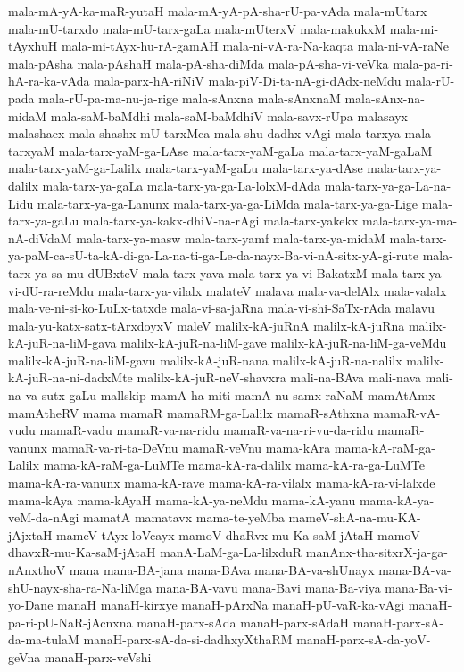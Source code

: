 {mala-mA-yA-ka-maR-yutaH
mala-mA-yA-pA-sha-rU-pa-vAda
mala-mUtarx
mala-mU-tarxdo
mala-mU-tarx-gaLa
mala-mUterxV
mala-makukxM
mala-mi-tAyxhuH
mala-mi-tAyx-hu-rA-gamAH
mala-ni-vA-ra-Na-kaqta
mala-ni-vA-raNe
mala-pAsha
mala-pAshaH
mala-pA-sha-diMda
mala-pA-sha-vi-veVka
mala-pa-ri-hA-ra-ka-vAda
mala-parx-hA-riNiV
mala-piV-Di-ta-nA-gi-dAdx-neMdu
mala-rU-pada
mala-rU-pa-ma-nu-ja-rige
mala-sAnxna
mala-sAnxnaM
mala-sAnx-na-midaM
mala-saM-baMdhi
mala-saM-baMdhiV
mala-savx-rUpa
malasayx
malashacx
mala-shashx-mU-tarxMca
mala-shu-dadhx-vAgi
mala-tarxya
mala-tarxyaM
mala-tarx-yaM-ga-LAse
mala-tarx-yaM-gaLa
mala-tarx-yaM-gaLaM
mala-tarx-yaM-ga-Lalilx
mala-tarx-yaM-gaLu
mala-tarx-ya-dAse
mala-tarx-ya-dalilx
mala-tarx-ya-gaLa
mala-tarx-ya-ga-La-lolxM-dAda
mala-tarx-ya-ga-La-na-Lidu
mala-tarx-ya-ga-Lanunx
mala-tarx-ya-ga-LiMda
mala-tarx-ya-ga-Lige
mala-tarx-ya-gaLu
mala-tarx-ya-kakx-dhiV-na-rAgi
mala-tarx-yakekx
mala-tarx-ya-ma-nA-diVdaM
mala-tarx-ya-masw
mala-tarx-yamf
mala-tarx-ya-midaM
mala-tarx-ya-paM-ca-sU-ta-kA-di-ga-La-na-ti-ga-Le-da-nayx-Ba-vi-nA-sitx-yA-gi-rute
mala-tarx-ya-sa-mu-dUBxteV
mala-tarx-yava
mala-tarx-ya-vi-BakatxM
mala-tarx-ya-vi-dU-ra-reMdu
mala-tarx-ya-vilalx
malateV
malava
mala-va-delAlx
mala-valalx
mala-ve-ni-si-ko-LuLx-tatxde
mala-vi-sa-jaRna
mala-vi-shi-SaTx-rAda
malavu
mala-yu-katx-satx-tArxdoyxV
maleV
malilx-kA-juRnA
malilx-kA-juRna
malilx-kA-juR-na-liM-gava
malilx-kA-juR-na-liM-gave
malilx-kA-juR-na-liM-ga-veMdu
malilx-kA-juR-na-liM-gavu
malilx-kA-juR-nana
malilx-kA-juR-na-nalilx
malilx-kA-juR-na-ni-dadxMte
malilx-kA-juR-neV-shavxra
mali-na-BAva
mali-nava
mali-na-va-sutx-gaLu
mallskip
mamA-ha-miti
mamA-nu-samx-raNaM
mamAtAmx
mamAtheRV
mama
mamaR
mamaRM-ga-Lalilx
mamaR-sAthxna
mamaR-vA-vudu
mamaR-vadu
mamaR-va-na-ridu
mamaR-va-na-ri-vu-da-ridu
mamaR-vanunx
mamaR-va-ri-ta-DeVnu
mamaR-veVnu
mama-kAra
mama-kA-raM-ga-Lalilx
mama-kA-raM-ga-LuMTe
mama-kA-ra-dalilx
mama-kA-ra-ga-LuMTe
mama-kA-ra-vanunx
mama-kA-rave
mama-kA-ra-vilalx
mama-kA-ra-vi-lalxde
mama-kAya
mama-kAyaH
mama-kA-ya-neMdu
mama-kA-yanu
mama-kA-ya-veM-da-nAgi
mamatA
mamatavx
mama-te-yeMba
mameV-shA-na-mu-KA-jAjxtaH
mameV-tAyx-loVcayx
mamoV-dhaRvx-mu-Ka-saM-jAtaH
mamoV-dhavxR-mu-Ka-saM-jAtaH
manA-LaM-ga-La-lilxduR
manAnx-tha-sitxrX-ja-ga-nAnxthoV
mana
mana-BA-jana
mana-BAva
mana-BA-va-shUnayx
mana-BA-va-shU-nayx-sha-ra-Na-liMga
mana-BA-vavu
mana-Bavi
mana-Ba-viya
mana-Ba-vi-yo-Dane
manaH
manaH-kirxye
manaH-pArxNa
manaH-pU-vaR-ka-vAgi
manaH-pa-ri-pU-NaR-jAcnxna
manaH-parx-sAda
manaH-parx-sAdaH
manaH-parx-sA-da-ma-tulaM
manaH-parx-sA-da-si-dadhxyXthaRM
manaH-parx-sA-da-yoV-geVna
manaH-parx-veVshi
}
